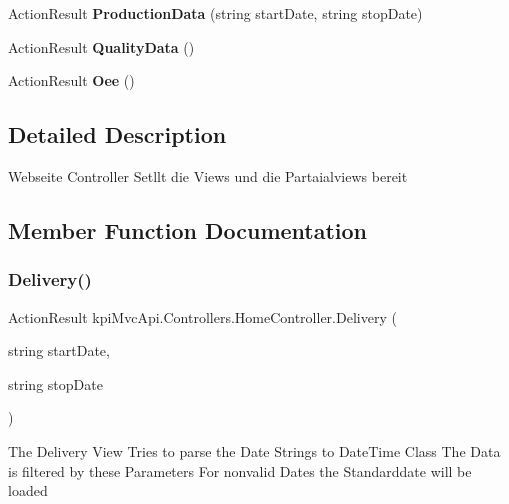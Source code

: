 \begin{DoxyCompactItemize}
Action\+Result {\bfseries Production\+Data} (string start\+Date, string stop\+Date)
\item 
\mbox{\label{classkpi_mvc_api_1_1_controllers_1_1_home_controller_a2b29fc025ba4bc7cb5be2cf16a4ab4b8}} 
Action\+Result {\bfseries Quality\+Data} ()
\item 
\mbox{\label{classkpi_mvc_api_1_1_controllers_1_1_home_controller_aa62132d07d9a778856a532fa6a2112b0}} 
Action\+Result {\bfseries Oee} ()
\end{DoxyCompactItemize}


\subsection{Detailed Description}
Webseite Controller Setllt die Views und die Partaialviews bereit 



\subsection{Member Function Documentation}
\mbox{\label{classkpi_mvc_api_1_1_controllers_1_1_home_controller_a0fe5ac7be69616c8f56e8938e042cc27}} 
\subsubsection{\texorpdfstring{Delivery()}{Delivery()}}
{\footnotesize\ttfamily Action\+Result kpi\+Mvc\+Api.\+Controllers.\+Home\+Controller.\+Delivery (\begin{DoxyParamCaption}\item[{string}]{start\+Date,  }\item[{string}]{stop\+Date }\end{DoxyParamCaption})\hspace{0.3cm}{\ttfamily [inline]}}



The Delivery View Tries to parse the Date Strings to Date\+Time Class The Data is filtered by these Parameters For nonvalid Dates the Standarddate will be loaded 


